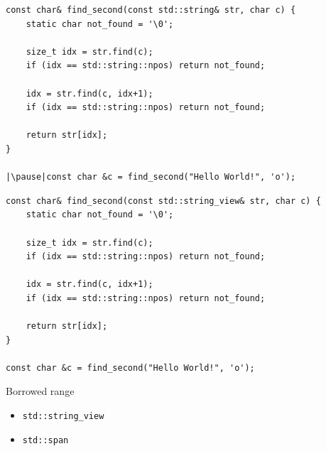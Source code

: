 \documentclass[aspectratio=169]{beamer}
\begin{document}
\begin{frame}[fragile,c]
\large
\begin{center}
\begin{verbatim}
const char& find_second(const std::string& str, char c) {
    static char not_found = '\0';

    size_t idx = str.find(c);
    if (idx == std::string::npos) return not_found;

    idx = str.find(c, idx+1);
    if (idx == std::string::npos) return not_found;

    return str[idx];
}

|\pause|const char &c = find_second("Hello World!", 'o');
\end{verbatim}
\end{center}
\let\thefootnote\relax{}
\end{frame}

\begin{frame}[fragile,c]
\large
\begin{center}
    \begin{verbatim}
const char& find_second(const std::string_view& str, char c) {
    static char not_found = '\0';

    size_t idx = str.find(c);
    if (idx == std::string::npos) return not_found;

    idx = str.find(c, idx+1);
    if (idx == std::string::npos) return not_found;

    return str[idx];
}

const char &c = find_second("Hello World!", 'o');
    \end{verbatim}
\end{center}
\let\thefootnote\relax{}
\end{frame}

\begin{frame}{Borrowed range}
    \begin{itemize}
        \item \texttt{std::string_view}
        \item \texttt{std::span}
    \end{itemize}
\end{frame}
\end{document}
